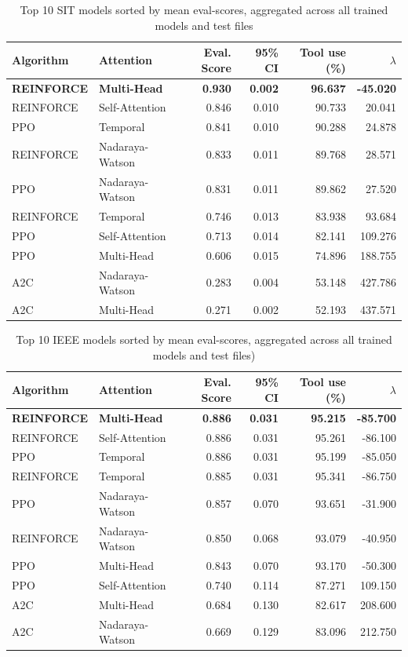 \documentclass[sn-basic]{sn-jnl} %
\begin{document}
\begin{table}
\caption{Top 10 SIT models sorted by mean eval-scores, aggregated across all trained models and test files}
\label{tab:sit_top10}
\begin{tabular}{ll r r r r}
\toprule
\textbf{Algorithm} & \textbf{Attention} & \textbf{Eval. Score} & \textbf{95\% CI} & \textbf{Tool use (\%)} & \textbf{$\lambda$}\\
\midrule
    \textbf{REINFORCE} & \textbf{Multi-Head} & \textbf{0.930} & \textbf{0.002} & \textbf{96.637} & \textbf{-45.020} \\
    REINFORCE & Self-Attention & 0.846 & 0.010 & 90.733 & 20.041 \\
    PPO & Temporal & 0.841 & 0.010 & 90.288 & 24.878 \\
    REINFORCE & Nadaraya-Watson & 0.833 & 0.011 & 89.768 & 28.571 \\
    PPO & Nadaraya-Watson & 0.831 & 0.011 & 89.862 & 27.520 \\
    REINFORCE & Temporal & 0.746 & 0.013 & 83.938 & 93.684 \\
    PPO & Self-Attention & 0.713 & 0.014 & 82.141 & 109.276 \\
    PPO & Multi-Head & 0.606 & 0.015 & 74.896 & 188.755 \\
    A2C & Nadaraya-Watson & 0.283 & 0.004 & 53.148 & 427.786 \\
    A2C & Multi-Head & 0.271 & 0.002 & 52.193 & 437.571 \\
    \bottomrule
\end{tabular}
\end{table}


\begin{table}[t]
	\centering
	\caption{Top 10 IEEE models sorted by mean eval-scores, aggregated across all trained models and test files)}
	\label{tab:ieee_top10}
	\begin{tabular}{ll r r r r}
	\toprule
	\textbf{Algorithm} & \textbf{Attention} & \textbf{Eval. Score} & \textbf{95\% CI} & \textbf{Tool use (\%)} & \textbf{$\lambda$}\\
	\midrule
	\textbf{REINFORCE} & \textbf{Multi-Head} & \textbf{0.886} & \textbf{0.031} & \textbf{95.215} & \textbf{-85.700}\\
	REINFORCE & Self-Attention 	& 0.886 & 0.031 & 95.261 & -86.100\\
	PPO & Temporal 				& 0.886 & 0.031 & 95.199 & -85.050\\
	REINFORCE & Temporal 		& 0.885 & 0.031 & 95.341 & -86.750\\
	PPO & Nadaraya-Watson 		& 0.857 & 0.070 & 93.651 & -31.900\\
	REINFORCE & Nadaraya-Watson	& 0.850 & 0.068 & 93.079 & -40.950\\
	PPO & Multi-Head 			& 0.843 & 0.070 & 93.170 & -50.300\\
	PPO & Self-Attention 		& 0.740 & 0.114 & 87.271 & 109.150\\
	A2C & Multi-Head 			& 0.684 & 0.130 & 82.617 & 208.600\\
	A2C & Nadaraya-Watson 		& 0.669 & 0.129 & 83.096 & 212.750\\
	\bottomrule
	\end{tabular}
\end{table}
\end{document}
